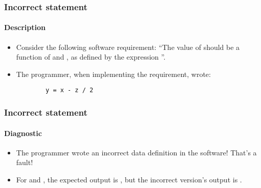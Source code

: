 \begin{frame}[hasprev=false,hasnext=false, fragile]
\label{example-incorrect-statement-example-0}
\label{example:incorrect-statement-2}
\frametitle{Incorrect statement}
\framesubtitle{Description}

\begin{itemize}
	\item Consider the following software requirement: ``The value of
	 should be a function of  and , as
	defined by the expression ''.

	\item The programmer, when implementing the requirement, wrote:
	\begin{lstlisting}
		y = x - z / 2
	\end{lstlisting}
\end{itemize}
\end{frame}


\begin{frame}
\frametitle{Incorrect statement}
\framesubtitle{Diagnostic}

\begin{itemize}
	\item The programmer wrote an incorrect data definition in the software!
	That's a fault!

	\item For  and , the expected output is
	, but the incorrect version's output is .
\end{itemize}

\end{frame}
